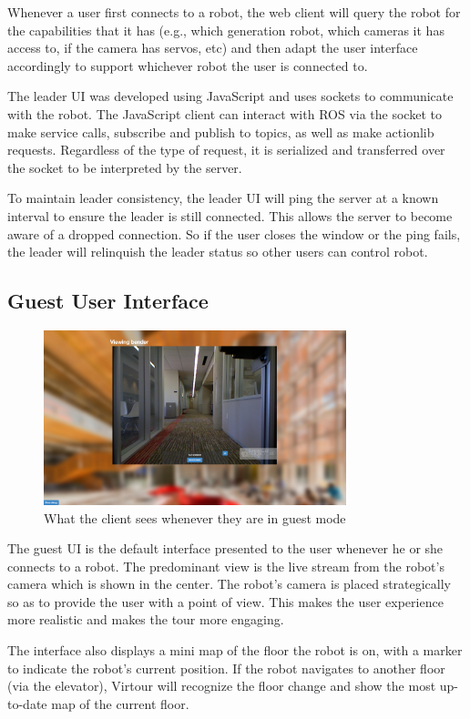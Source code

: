 \documentclass[
  oneside,
  11pt, a4paper,
  footinclude=true,
  headinclude=true,
  cleardoublepage=empty
]{article}
\begin{document}
Whenever a user first connects to a robot, the web client will query the robot
for the capabilities that it has (e.g., which generation robot, which cameras it
has access to, if the camera has servos, etc) and then adapt the user
interface accordingly to support whichever robot the user is connected to.

The leader UI was developed using JavaScript and uses sockets to
communicate with the robot. The JavaScript client can interact with ROS via the
socket to make service calls, subscribe and publish to topics, as well as make
actionlib requests. Regardless of the type of request, it is serialized and
transferred over the socket to be interpreted by the server.

To maintain leader consistency, the leader UI will ping the server at
a known interval to ensure the leader is still connected. This allows the
server to become aware of a dropped connection. So if the user closes the window
or the ping fails, the leader will relinquish the leader status so other users
can control robot.


\subsection{Guest User Interface}

\begin{figure}
  \centering
  \includegraphics[height=2in]{guestUI}
  \caption{What the client sees whenever they are in guest mode}
  \label{fig:guest_mode}
\end{figure}

The guest UI is the default interface presented to the user whenever he or she
connects to a robot. The predominant view is the live stream from the robot's
camera which is shown in the center. The robot's camera is placed strategically
so as to provide the user with a point of view. This makes the user experience
more realistic and makes the tour more engaging.

The interface also displays a mini map of the floor the robot is
on, with a marker to indicate the robot's current position.  If the
robot navigates to another floor (via the elevator), Virtour will recognize the
floor change and show the most up-to-date map of the current floor.
\end{document}
